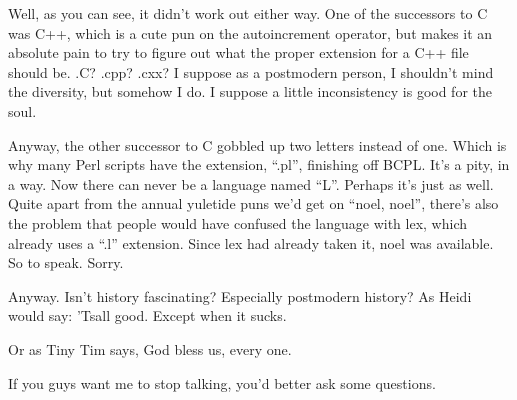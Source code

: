 \documentclass[10pt,letterpaper]{article}
\newcommand{\acro}[1]{{\small\MakeUppercase #1\spacefactor1000}}
\begin{document}
Well, as you can see, it didn't work out either way. One of the successors to
C was C++, which is a cute pun on the autoincrement operator, but makes it an
absolute pain to try to figure out what the proper extension for a C++ file
should be. .C? .cpp? .cxx? I suppose as a postmodern person, I shouldn't mind
the diversity, but somehow I do. I suppose a little inconsistency is good for
the soul.

Anyway, the other successor to C gobbled up two letters instead of one. Which
is why many Perl scripts have the extension, ``.pl'', finishing off \acro{BCPL}.
It's a pity, in a way. Now there can never be a language named ``L''.
Perhaps it's just as well. Quite apart from the annual yuletide puns we'd get
on ``noel, noel'', there's also the problem that people would have confused
the language with lex, which already uses a ``.l'' extension. Since lex had
already taken it, noel was available. So to speak. Sorry.

Anyway. Isn't history fascinating? Especially postmodern history? As Heidi
would say: 'Tsall good. Except when it sucks.

Or as Tiny Tim says, God bless us, every one.

If you guys want me to stop talking, you'd better ask some questions.
\end{document}
